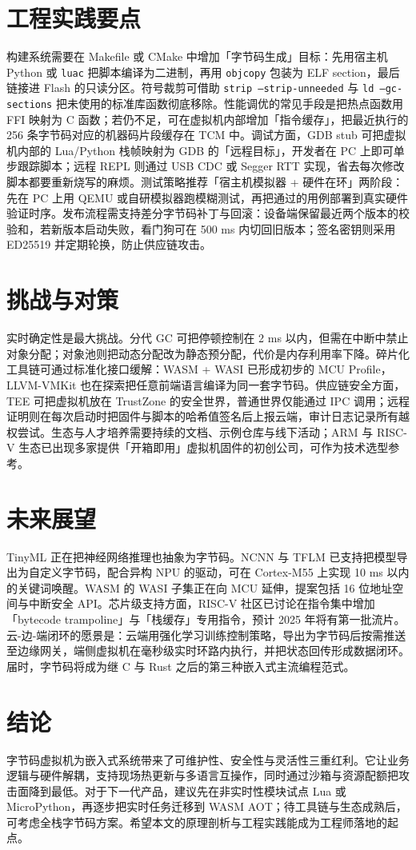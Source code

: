 \chapter{工程实践要点}
构建系统需要在 Makefile 或 CMake 中增加「字节码生成」目标：先用宿主机 Python 或 \texttt{luac} 把脚本编译为二进制，再用 \texttt{objcopy} 包装为 ELF section，最后链接进 Flash 的只读分区。符号裁剪可借助 \texttt{strip --strip-unneeded} 与 \texttt{ld --gc-sections} 把未使用的标准库函数彻底移除。性能调优的常见手段是把热点函数用 FFI 映射为 C 函数；若仍不足，可在虚拟机内部增加「指令缓存」，把最近执行的 256 条字节码对应的机器码片段缓存在 TCM 中。调试方面，GDB stub 可把虚拟机内部的 Lua/Python 栈帧映射为 GDB 的「远程目标」，开发者在 PC 上即可单步跟踪脚本；远程 REPL 则通过 USB CDC 或 Segger RTT 实现，省去每次修改脚本都要重新烧写的麻烦。测试策略推荐「宿主机模拟器 + 硬件在环」两阶段：先在 PC 上用 QEMU 或自研模拟器跑模糊测试，再把通过的用例部署到真实硬件验证时序。发布流程需支持差分字节码补丁与回滚：设备端保留最近两个版本的校验和，若新版本启动失败，看门狗可在 500 ms 内切回旧版本；签名密钥则采用 ED25519 并定期轮换，防止供应链攻击。\par
\chapter{挑战与对策}
实时确定性是最大挑战。分代 GC 可把停顿控制在 2 ms 以内，但需在中断中禁止对象分配；对象池则把动态分配改为静态预分配，代价是内存利用率下降。碎片化工具链可通过标准化接口缓解：WASM + WASI 已形成初步的 MCU Profile，LLVM-VMKit 也在探索把任意前端语言编译为同一套字节码。供应链安全方面，TEE 可把虚拟机放在 TrustZone 的安全世界，普通世界仅能通过 IPC 调用；远程证明则在每次启动时把固件与脚本的哈希值签名后上报云端，审计日志记录所有越权尝试。生态与人才培养需要持续的文档、示例仓库与线下活动；ARM 与 RISC-V 生态已出现多家提供「开箱即用」虚拟机固件的初创公司，可作为技术选型参考。\par
\chapter{未来展望}
TinyML 正在把神经网络推理也抽象为字节码。NCNN 与 TFLM 已支持把模型导出为自定义字节码，配合异构 NPU 的驱动，可在 Cortex-M55 上实现 10 ms 以内的关键词唤醒。WASM 的 WASI 子集正在向 MCU 延伸，提案包括 16 位地址空间与中断安全 API。芯片级支持方面，RISC-V 社区已讨论在指令集中增加「bytecode trampoline」与「栈缓存」专用指令，预计 2025 年将有第一批流片。云-边-端闭环的愿景是：云端用强化学习训练控制策略，导出为字节码后按需推送至边缘网关，端侧虚拟机在毫秒级实时环路内执行，并把状态回传形成数据闭环。届时，字节码将成为继 C 与 Rust 之后的第三种嵌入式主流编程范式。\par
\chapter{结论}
字节码虚拟机为嵌入式系统带来了可维护性、安全性与灵活性三重红利。它让业务逻辑与硬件解耦，支持现场热更新与多语言互操作，同时通过沙箱与资源配额把攻击面降到最低。对于下一代产品，建议先在非实时性模块试点 Lua 或 MicroPython，再逐步把实时任务迁移到 WASM AOT；待工具链与生态成熟后，可考虑全栈字节码方案。希望本文的原理剖析与工程实践能成为工程师落地的起点。\par
